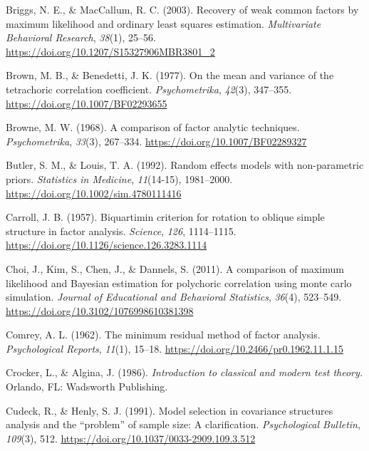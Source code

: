 \documentclass[
  english,
  man]{apa6}
\begin{document}
\leavevmode\hypertarget{ref-briggs2003}{}%
Briggs, N. E., \& MacCallum, R. C. (2003). Recovery of weak common factors by maximum likelihood and ordinary least squares estimation. \emph{Multivariate Behavioral Research}, \emph{38}(1), 25--56. \url{https://doi.org/10.1207/S15327906MBR3801_2}

\leavevmode\hypertarget{ref-brown1977mean}{}%
Brown, M. B., \& Benedetti, J. K. (1977). On the mean and variance of the tetrachoric correlation coefficient. \emph{Psychometrika}, \emph{42}(3), 347--355. \url{https://doi.org/10.1007/BF02293655}

\leavevmode\hypertarget{ref-browne1968comparison}{}%
Browne, M. W. (1968). A comparison of factor analytic techniques. \emph{Psychometrika}, \emph{33}(3), 267--334. \url{https://doi.org/10.1007/BF02289327}

\leavevmode\hypertarget{ref-butler1992}{}%
Butler, S. M., \& Louis, T. A. (1992). Random effects models with non-parametric priors. \emph{Statistics in Medicine}, \emph{11}(14-15), 1981--2000. \url{https://doi.org/10.1002/sim.4780111416}

\leavevmode\hypertarget{ref-carroll1957}{}%
Carroll, J. B. (1957). Biquartimin criterion for rotation to oblique simple structure in factor analysis. \emph{Science}, \emph{126}, 1114--1115. \url{https://doi.org/10.1126/science.126.3283.1114}

\leavevmode\hypertarget{ref-choi2011}{}%
Choi, J., Kim, S., Chen, J., \& Dannels, S. (2011). A comparison of maximum likelihood and Bayesian estimation for polychoric correlation using monte carlo simulation. \emph{Journal of Educational and Behavioral Statistics}, \emph{36}(4), 523--549. \url{https://doi.org/10.3102/1076998610381398}

\leavevmode\hypertarget{ref-comrey1962minimum}{}%
Comrey, A. L. (1962). The minimum residual method of factor analysis. \emph{Psychological Reports}, \emph{11}(1), 15--18. \url{https://doi.org/10.2466/pr0.1962.11.1.15}

\leavevmode\hypertarget{ref-CrockerAlgina}{}%
Crocker, L., \& Algina, J. (1986). \emph{Introduction to classical and modern test theory.} Orlando, FL: Wadsworth Publishing.

\leavevmode\hypertarget{ref-cudeck1991model}{}%
Cudeck, R., \& Henly, S. J. (1991). Model selection in covariance structures analysis and the ``problem'' of sample size: A clarification. \emph{Psychological Bulletin}, \emph{109}(3), 512. \url{https://doi.org/10.1037/0033-2909.109.3.512}
\end{document}
